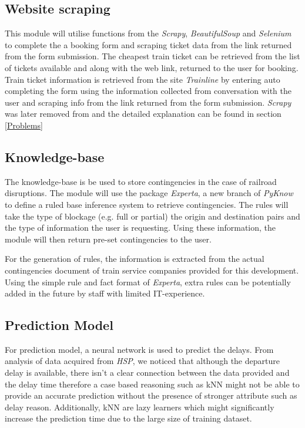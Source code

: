 \documentclass[11pt]{article}
\begin{document}
\subsection{Website scraping}
This module will utilise functions from the \textit{Scrapy}, \textit{BeautifulSoup} and \textit{Selenium} to complete the a booking form and scraping ticket data from the link returned from the form submission. The cheapest train ticket can be retrieved from the list of tickets available and along with the web link, returned to the user for booking. Train ticket information is retrieved from the site \textit{Trainline} by entering auto completing the form using the information collected from conversation with the user and scraping info from the link returned from the form submission. \textit{Scrapy} was later removed from and the detailed explanation can be found in section \ref{Problems}

\subsection{Knowledge-base}
The knowledge-base is be used to store contingencies in the case of railroad disruptions. The module will use the package \textit{Experta}, a new branch of \textit{PyKnow} to define a ruled base inference system to retrieve contingencies. The rules will take the type of blockage (e.g. full or partial) the origin and destination pairs and the type of information the user is requesting. Using these information, the module will then return pre-set contingencies to the user.

For the generation of rules, the information is extracted from the actual contingencies document of train service companies provided for this development. Using the simple rule and fact format of \textit{Experta}, extra rules can be potentially added in the future by staff with limited IT-experience.

\subsection{Prediction Model}
For prediction model, a neural network is used to predict the delays. From analysis of data acquired from \textit{HSP}, we noticed that although the departure delay is available, there isn't a clear connection between the data provided and the delay time therefore a case based reasoning such as kNN might not be able to provide an accurate prediction without the presence of stronger attribute such as delay reason. Additionally, kNN are lazy learners which might significantly increase the prediction time due to the large size of training dataset.
\end{document}
